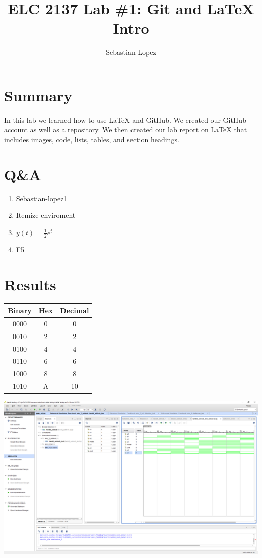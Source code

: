 \documentclass[11pt]{article}
\begin{document}
\title{ELC 2137 Lab \#1: Git and LaTeX Intro}
\author{Sebastian Lopez}

\maketitle


\section*{Summary}

In this lab we learned how to use LaTeX and GitHub. We created our GitHub account as well as a repository. We then created our lab report on LaTeX that includes images, code, lists, tables, and section headings. 

\section*{Q\&A}

\begin{enumerate}
	\item Sebastian-lopez1
	\item Itemize enviroment 
	\item $y(t) = \frac{1}{2} e^t$
	\item F5
\end{enumerate}

\section*{Results}

\begin{center}
	\begin{tabular}{c|c|c}
		\toprule
		Binary & Hex & Decimal \\
		\midrule
		 0000  &  0  &    0 \\
		 0010  &  2  &    2 \\
		 0100  &  4  &    4 \\
		 0110  &  6  &    6 \\
		 1000  &  8  &    8 \\
		 1010  &  A  &    10 \\
		\bottomrule
	\end{tabular} 
\begin{center}
\includegraphics[width=\textwidth,trim=540 455 15 130,clip]{lab1_example_screenshot}
\end{center}
\end{center}
\end{document}
